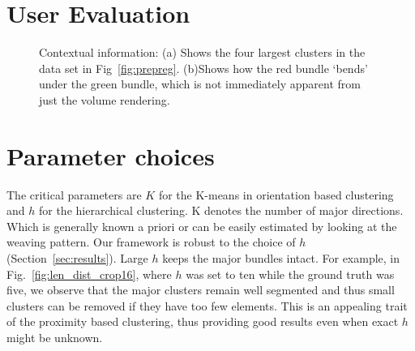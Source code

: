 %  
 








\section {User Evaluation}
\label {sec:evaluation}
\begin{figure}[h]
\centering
{}
\caption{Contextual information: (a) Shows the four largest clusters in the data set in Fig~\ref{fig:prepreg}.
(b)Shows how the red bundle `bends' under the green bundle, which is not immediately apparent from just the volume rendering.}
\label{fig:context}
\end{figure}

\section{Parameter choices}
\label{sec:param_choices}
The critical parameters are $K$ for the K-means in orientation based clustering and $h$ for the hierarchical clustering. K denotes the number of major directions. Which is generally known a priori or can be easily estimated by looking at the weaving pattern. 
Our framework is robust to the choice of $h$ (Section~\ref{sec:results}). Large $h$ keeps the major bundles intact. For example, in  Fig.~\ref{fig:len_dist_crop16}, where $h$ was set to ten while the ground truth was five, we observe that the major clusters remain well segmented and thus small clusters can be removed if they have too few elements. This is an appealing trait of the proximity based clustering, thus providing good results even when exact $h$ might be unknown.


